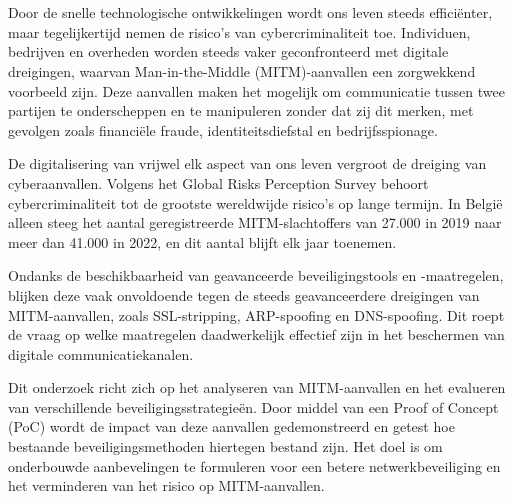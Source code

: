 
\chapter{}%
\label{ch:inleiding}

Door de snelle technologische ontwikkelingen wordt ons leven steeds efficiënter, maar tegelijkertijd nemen de risico's van cybercriminaliteit toe. Individuen, bedrijven en overheden worden steeds vaker geconfronteerd met digitale dreigingen, waarvan Man-in-the-Middle (MITM)-aanvallen een zorgwekkend voorbeeld zijn. Deze aanvallen maken het mogelijk om communicatie tussen twee partijen te onderscheppen en te manipuleren zonder dat zij dit merken, met gevolgen zoals financiële fraude, identiteitsdiefstal en bedrijfsspionage.

De digitalisering van vrijwel elk aspect van ons leven vergroot de dreiging van cyberaanvallen. Volgens het Global Risks Perception Survey behoort cybercriminaliteit tot de grootste wereldwijde risico’s op lange termijn. In België alleen steeg het aantal geregistreerde MITM-slachtoffers van 27.000 in 2019 naar meer dan 41.000 in 2022, en dit aantal blijft elk jaar toenemen\autocite{Politie2024}.

Ondanks de beschikbaarheid van geavanceerde beveiligingstools en -maatregelen, blijken deze vaak onvoldoende tegen de steeds geavanceerdere dreigingen van MITM-aanvallen, zoals SSL-stripping, ARP-spoofing en DNS-spoofing. Dit roept de vraag op welke maatregelen daadwerkelijk effectief zijn in het beschermen van digitale communicatiekanalen.

Dit onderzoek richt zich op het analyseren van MITM-aanvallen en het evalueren van verschillende beveiligingsstrategieën. Door middel van een Proof of Concept (PoC) wordt de impact van deze aanvallen gedemonstreerd en getest hoe bestaande beveiligingsmethoden hiertegen bestand zijn. Het doel is om onderbouwde aanbevelingen te formuleren voor een betere netwerkbeveiliging en het verminderen van het risico op MITM-aanvallen.


\section{}%
\label{sec:probleemstelling}

